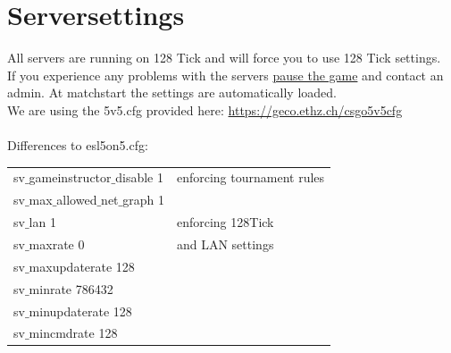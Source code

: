 \documentclass{article}
\begin{document}
\section{Serversettings}
All servers are running on 128 Tick and will force you to use 128 Tick settings.\\
If you experience any problems with the servers \hyperref[sec:pause]{pause the game} and contact an admin. At matchstart the settings are automatically loaded.\\
We are using the 5v5.cfg provided here:
\url{https://geco.ethz.ch/csgo5v5cfg} \\\\
Differences to esl5on5.cfg:\\
\begin{tabular}{ | l | l | }
	\hline			
	sv$\_$gameinstructor$\_$disable 1 & enforcing tournament rules\\
	sv$\_$max$\_$allowed$\_$net$\_$graph 1 &  \\
	\hline
	sv$\_$lan 1 & enforcing 128Tick  \\
	sv$\_$maxrate 0 & and LAN settings \\
	sv$\_$maxupdaterate 128 & \\
	sv$\_$minrate 786432 & \\
	sv$\_$minupdaterate 128 & \\
	sv$\_$mincmdrate 128 & \\
	\hline  
\end{tabular}
\end{document}
